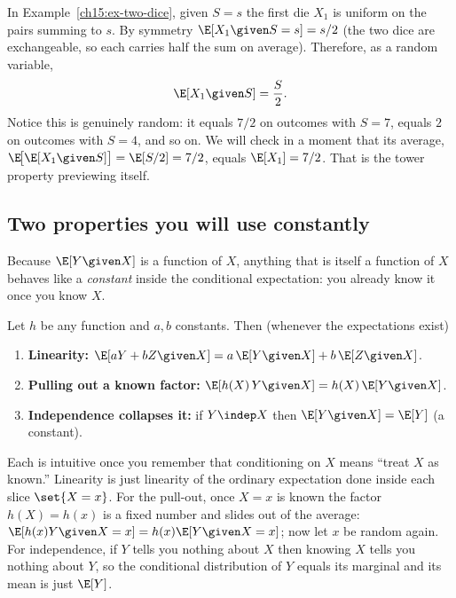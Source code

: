 \begin{example}
In Example~\ref{ch15:ex-two-dice}, given $S = s$ the first die $X_1$ is uniform on the pairs summing to
$s$. By symmetry $\E[X_1 \given S = s] = s/2$ (the two dice are exchangeable, so each carries half the
sum on average). Therefore, as a random variable,
\[
  \E[X_1 \given S] = \frac{S}{2}.
\]
Notice this is genuinely random: it equals $7/2$ on outcomes with $S = 7$, equals $2$ on outcomes with
$S = 4$, and so on. We will check in a moment that its average, $\E\!\big[\E[X_1\given S]\big]
= \E[S/2] = 7/2$, equals $\E[X_1] = 7/2$. That is the tower property previewing itself.
\end{example}

\subsection{Two properties you will use constantly}
Because $\E[Y \given X]$ is a function of $X$, anything that is itself a function of $X$ behaves like a
\emph{constant} inside the conditional expectation: you already know it once you know $X$.

\begin{proposition}
\label{ch15:prop-pullout}
Let $h$ be any function and $a, b$ constants. Then (whenever the expectations exist)
\begin{enumerate}
  \item \textbf{Linearity:} $\E[aY + bZ \given X] = a\,\E[Y\given X] + b\,\E[Z \given X]$.
  \item \textbf{Pulling out a known factor:} $\E[h(X)\,Y \given X] = h(X)\,\E[Y \given X]$.
  \item \textbf{Independence collapses it:} if $Y \indep X$ then $\E[Y \given X] = \E[Y]$ (a constant).
\end{enumerate}
\end{proposition}

\begin{whybox}
Each is intuitive once you remember that conditioning on $X$ means ``treat $X$ as known.'' Linearity is
just linearity of the ordinary expectation done inside each slice $\set{X=x}$. For the pull-out, once
$X = x$ is known the factor $h(X) = h(x)$ is a fixed number and slides out of the average:
$\E[h(x) Y \given X = x] = h(x)\E[Y\given X = x]$; now let $x$ be random again. For independence, if $Y$
tells you nothing about $X$ then knowing $X$ tells you nothing about $Y$, so the conditional
distribution of $Y$ equals its marginal and its mean is just $\E[Y]$.
\end{whybox}

